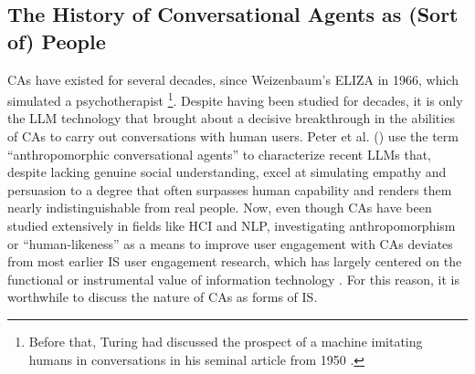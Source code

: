 \documentclass[manuscript,anonymous,sigconf]{acmart}
\begin{document}
\subsection{The History of Conversational Agents as (Sort of) People}
CAs have existed for several decades, since Weizenbaum's ELIZA in 1966, which simulated a psychotherapist \citep{weizenbaum_elizacomputer_1966}\footnote{Before that, Turing had discussed the prospect of a machine imitating humans in conversations in his seminal article from 1950 \citep{turing_computing_1950}.}. Despite having been studied for decades, it is only the LLM technology that brought about a decisive breakthrough in the abilities of CAs to carry out conversations with human users. Peter et al. (\citeyear{peter_benefits_2025}) use the term ``anthropomorphic conversational agents'' to characterize recent LLMs that, despite lacking genuine social understanding, excel at simulating empathy and persuasion to a degree that often surpasses human capability and renders them nearly indistinguishable from real people. Now, even though CAs have been studied extensively in fields like HCI and NLP, investigating anthropomorphism or ``human-likeness'' as a means to improve user engagement with CAs deviates from most earlier IS user engagement research, which has largely centered on the functional or instrumental value of information technology \citep{chandra_be_2022}. For this reason, it is worthwhile to discuss the nature of CAs as forms of IS.
\end{document}
